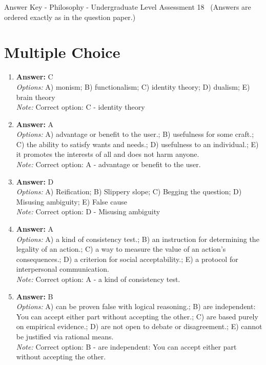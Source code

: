 \documentclass[12pt]{article}
\begin{document}
\begin{center}
Answer Key - Philosophy - Undergraduate Level Assessment 18 \
\small (Answers are ordered exactly as in the question paper.)
\end{center}

\section*{Multiple Choice}
\begin{enumerate}[label=\arabic*.]
\item \textbf{Answer:} C
\\ \textit{Options:} A) monism; B) functionalism; C) identity theory; D) dualism; E) brain theory
\\ \textit{Note:} Correct option: C - identity theory
\item \textbf{Answer:} A
\\ \textit{Options:} A) advantage or benefit to the user.; B) usefulness for some craft.; C) the ability to satisfy wants and needs.; D) usefulness to an individual.; E) it promotes the interests of all and does not harm anyone.
\\ \textit{Note:} Correct option: A - advantage or benefit to the user.
\item \textbf{Answer:} D
\\ \textit{Options:} A) Reification; B) Slippery slope; C) Begging the question; D) Misusing ambiguity; E) False cause
\\ \textit{Note:} Correct option: D - Misusing ambiguity
\item \textbf{Answer:} A
\\ \textit{Options:} A) a kind of consistency test.; B) an instruction for determining the legality of an action.; C) a way to measure the value of an action's consequences.; D) a criterion for social acceptability.; E) a protocol for interpersonal communication.
\\ \textit{Note:} Correct option: A - a kind of consistency test.
\item \textbf{Answer:} B
\\ \textit{Options:} A) can be proven false with logical reasoning.; B) are independent: You can accept either part without accepting the other.; C) are based purely on empirical evidence.; D) are not open to debate or disagreement.; E) cannot be justified via rational means.
\\ \textit{Note:} Correct option: B - are independent: You can accept either part without accepting the other.
\end{enumerate}
\end{document}
